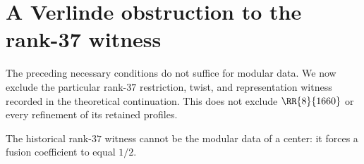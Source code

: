 \section{A Verlinde obstruction to the rank-37 witness}
\label{sec:1660-witness-verlinde}

The preceding necessary conditions do not suffice for modular data. We now
exclude the particular rank-$37$ restriction, twist, and representation
witness recorded in the theoretical continuation. This does not exclude
$\RR{8}{1660}$ or every refinement of its retained profiles.

\begin{proposition}\label{prop:1660-witness-verlinde}
The historical rank-$37$ witness cannot be the modular data of a center:
it forces a fusion coefficient to equal $1/2$.
\end{proposition}
